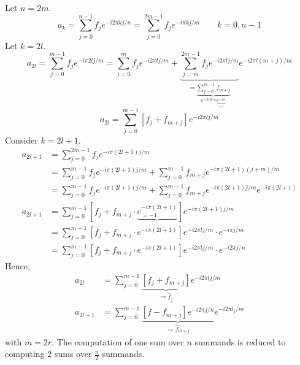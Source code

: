 \documentclass{article}
\begin{document}
Let $n = 2m$.
\[ a_k = \sum_{j=0}^{n-1} f_j e^{-i2\pi kj/n} = \sum_{j=0}^{2m-1} f_j e^{-i\pi kj/m} \qquad k = 0,n-1 \]
Let $k = 2l$.
\[ a_{2l} = \sum_{j=0}^{m-1} f_j e^{-i\pi 2l j/m} = \sum_{j=0}^m f_j e^{-i2\pi lj / m} + \underbrace{\sum_{j=m}^{2m-1} f_j e^{-i2\pi lj / m}}_{= \underbrace{\sum_{j=0}^{m-1} f_{m+j}}_{e^{-i2\pi lk/m} \underbrace{e^{-2\pi l}}_{=1}}} e^{-i2\pi l(m+j)/m} \]
\[ a_{2l} = \sum_{j=0}^{m-1} \left[f_j + f_{m+j}\right] e^{-i2\pi lj / m} \]
Consider $k = 2l+1$.
\begin{align*}
  a_{2l+1} &= \sum_{j=0}^{2m-1} f_j e^{-i\pi (2l+1) j/m} \\
    &= \sum_{j=0}^{m-1} f_j e^{-i\pi (2l+1) j/m} + \sum_{j=0}^{m-1} f_{m+j} e^{-i\pi (2l+1) (j+m) /m} \\
    &= \sum_{j=0}^{m-1} f_j e^{-i\pi (2l+1) j/m} + \sum_{j=0}^{m-1} f_{m+j} e^{-i\pi (2l+1) j/m} e^{-i\pi (2l+1)} \\
  a_{2l+1} &= \sum_{j=0}^{m-1} \left[f_j + f_{m+j} \cdot \underbrace{e^{-i\pi (2l+1)}_{=-1}} \right] e^{-i\pi (2l+1) j/m} \\
    &= \sum_{j=0}^{m-1} \left[f_j + f_{m+j} \cdot e^{-i\pi (2l+1)} \right] e^{-i2\pi lj/m} \cdot e^{-i\pi j/m} \\
    &= \sum_{j=0}^{m-1} \left[f_j + f_{m+j} \cdot e^{-i\pi (2l+1)} \right] e^{-i2\pi lj/m} \cdot e^{-i2\pi j/n}
\end{align*}
Hence,
\begin{align*}
  a_{2l} &= \sum_{j=0}^{m-1} \underbrace{\left[f_j + f_{m+j}\right]}_{\coloneqq \hat f_j} e^{-i2\pi lj/m} \\
  a_{2l+1} &= \sum_{j=0}^{m-1} \underbrace{\left[f - f_{m+j}\right] e^{-i2\pi j/n}}_{\coloneqq \hat f_{m+j}} e^{-i2\pi l_j/m}
\end{align*}
with $m=2r$. %
The computation of one sum over $n$ summands is reduced to computing $2$ sums over $\frac n2$ summands.
\end{document}
